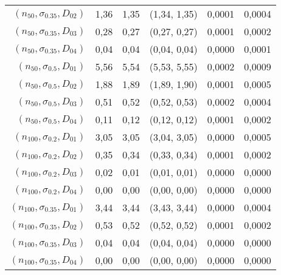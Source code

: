 \documentclass[preprint,12pt]{elsarticle}
\begin{document}
\begin{appendices}
\begin{table}[htbp]
\begin{tabular}{rrrcrr}
    $(n_{50},\sigma_{0.35},D_{02})$ & 1,36  & 1,35  & (1,34, 1,35) & 0,0001 & 0,0004 \\
    $(n_{50},\sigma_{0.35},D_{03})$ & 0,28  & 0,27  & (0,27, 0,27) & 0,0001 & 0,0002 \\
    $(n_{50},\sigma_{0.35},D_{04})$ & 0,04  & 0,04  & (0,04, 0,04) & 0,0000 & 0,0001 \\
    $(n_{50},\sigma_{0.5},D_{01})$ & 5,56  & 5,54  & (5,53, 5,55) & 0,0002 & 0,0009 \\
    $(n_{50},\sigma_{0.5},D_{02})$ & 1,88  & 1,89  & (1,89, 1,90) & 0,0001 & 0,0005 \\
    $(n_{50},\sigma_{0.5},D_{03})$ & 0,51  & 0,52  & (0,52, 0,53) & 0,0002 & 0,0004 \\
    $(n_{50},\sigma_{0.5},D_{04})$ & 0,11  & 0,12  & (0,12, 0,12) & 0,0001 & 0,0002 \\
    $(n_{100},\sigma_{0.2},D_{01})$ & 3,05  & 3,05  & (3,04, 3,05) & 0,0000 & 0,0005 \\
    $(n_{100},\sigma_{0.2},D_{02})$ & 0,35  & 0,34  & (0,33, 0,34) & 0,0001 & 0,0002 \\
    $(n_{100},\sigma_{0.2},D_{03})$ & 0,02  & 0,01  & (0,01, 0,01) & 0,0000 & 0,0000 \\
    $(n_{100},\sigma_{0.2},D_{04})$ & 0,00  & 0,00  & (0,00, 0,00) & 0,0000 & 0,0000 \\
    $(n_{100},\sigma_{0.35},D_{01})$ & 3,44  & 3,44  & (3,43, 3,44) & 0,0000 & 0,0004 \\
    $(n_{100},\sigma_{0.35},D_{02})$ & 0,53  & 0,52  & (0,52, 0,52) & 0,0001 & 0,0002 \\
    $(n_{100},\sigma_{0.35},D_{03})$ & 0,04  & 0,04  & (0,04, 0,04) & 0,0000 & 0,0000 \\
    $(n_{100},\sigma_{0.35},D_{04})$ & 0,00  & 0,00  & (0,00, 0,00) & 0,0000 & 0,0000 \\
    \bottomrule
    \end{tabular}
  \label{lognormal1}%
\end{table}%



\end{appendices}
\end{document}
